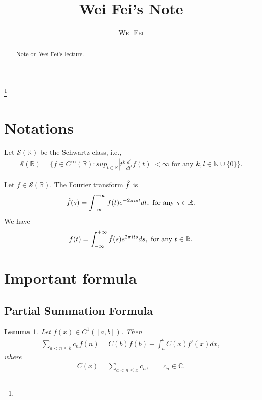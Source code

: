 \documentclass[a4paper,10pt]{amsart}
\newtheorem{lemma}{Lemma}[section]
\newcommand{\SSS}{\mathcal S}
\newcommand{\C}{\mathbb C} %
\newcommand{\R}{\mathbb R}  %
\newcommand{\N}{\mathbb N} %
\newcommand{\titleinfo}{Wei Fei's Note}
\newcommand{\authorinfo}{Wei Fei}
\begin{document}
\title{\LARGE\textbf{\titleinfo}} 

\author{\large\textsc{\authorinfo}} 
\address{AMSS}  
\email{}

\date{}


\begin{abstract}
    Note on Wei Fei's lecture.
\end{abstract}


\thanks{}

\maketitle

\section{Notations}
Let $\SSS(\R)$ be the Schwartz class, i.e., 
\begin{align*}
    \SSS(\R) = \{f \in C^{\infty}(\R) : 
        sup_{t \in \R}|t^{k}\frac{d^{l}}{dt^{l}}f(t)| < \infty 
    \mbox{ for any $k, l \in \N \cup \{0\}$} \}.
\end{align*}

Let $f \in \SSS(\R)$. The Fourier transform $\Hat{f}$ is
\begin{align*}
    \Hat{f}(s) = \int^{+\infty}_{-\infty} f(t)e^{-2\pi i st}dt, 
    \mbox{ for any $s \in \R$}.
\end{align*}
We have
\begin{align*}
    f(t) =  \int^{+\infty}_{-\infty} \Hat{f}(s)e^{2\pi i ts}ds, 
    \mbox{ for any $t \in \R$}.
\end{align*}


\section{Important formula}

\subsection{Partial Summation Formula}
\begin{lemma}
    Let $f(x) \in C^{1}([a, b])$. Then
    \begin{align*}
        \sum_{a < n \leq b} c_n f(n) = C(b)f(b) - \int^{b}_{a}C(x)f'(x)dx, 
    \end{align*}
    where
    \begin{align*}
        C(x) = \sum_{a < n \leq x} c_n,  \qquad c_n \in \C.
    \end{align*}
\end{lemma}
\end{document}
